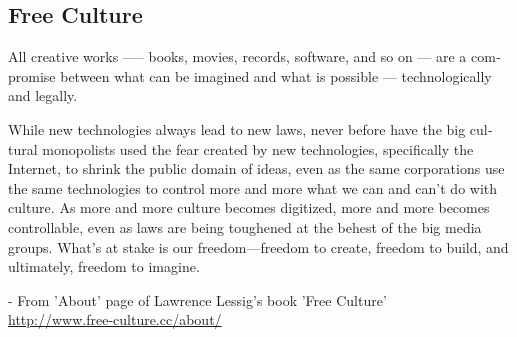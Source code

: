 \begin{english}
\section*{Free Culture}
All creative works --— books, movies, records, software, and so on --- are a compromise between what can be imagined and what is possible --- technologically and legally.

While new technologies always lead to new laws, never before have the big cultural monopolists used the fear created by new technologies, specifically the Internet, to shrink the public domain of ideas, even as the same corporations use the same technologies to control more and more what we can and can’t do with culture. As more and more culture becomes digitized, more and more becomes controllable, even as laws are being toughened at the behest of the big media groups. What’s at stake is our freedom—freedom to create, freedom to build, and ultimately, freedom to imagine.
\begin{flushright}- From 'About' page of Lawrence Lessig's book 'Free Culture'\\
\url{http://www.free-culture.cc/about/}\end{flushright}
\end{english}
